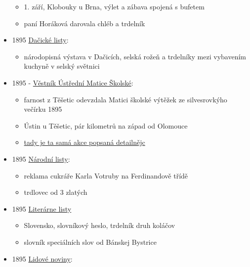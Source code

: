 \begin{itemize}
  \begin{itemize}
  \tightlist
  \item
    1. září, Klobouky u Brna, výlet a zábava spojená s bufetem
  \item
    paní Horáková darovala chléb a trdelník
  \end{itemize}
\item
  1895
  \href{https://www.digitalniknihovna.cz/vkol/uuid/uuid:a7f4aea1-a2cd-4d9f-a1fa-b43aa3c25dff}{Dačické
  listy}:

  \begin{itemize}
  \tightlist
  \item
    národopisná výstava v Dačicích, selská rožeň a trdelníky mezi
    vybavením kuchyně v selský světnici
  \end{itemize}
\item
  1895 -
  \href{https://ndk.cz/view/uuid:77d41380-a2e4-11e7-a093-005056825209?page=uuid\%3A9cb54070-a343-11e7-a093-005056825209&fulltext=trdeln\%C3\%ADk}{Věstník
  Ústřední Matice Školské}:

  \begin{itemize}
  \tightlist
  \item
    farnost z Těšetic odevzdala Matici školské výtěžek ze silvesrovkýho
    večírku 1895
  \item
    Ústin u Těšetic, pár kilometrů na západ od Olomouce
  \item
    \href{https://ndk.cz/view/uuid:eb8e3d99-435d-11dd-b505-00145e5790ea?page=uuid\%3A04295899-610e-49f5-b5b3-35f73d41b05d&fulltext=trdeln\%C3\%ADk}{tady
    je ta samá akce popsaná detailnějc}
  \end{itemize}
\item
  1895
  \href{https://ceskadigitalniknihovna.cz/uuid/uuid:6ef09ed4-435f-11dd-b505-00145e5790ea}{Národní
  listy}:

  \begin{itemize}
  \tightlist
  \item
    reklama cukráře Karla Votruby na Ferdinandově třídě
  \item
    trdlovec od 3 zlatých
  \end{itemize}
\item
  1895
  \href{https://dikda.snk.sk/uuid/uuid:dde694e6-6191-4983-bed1-e6328f0c9bf4}{Literárne
  listy}

  \begin{itemize}
  \tightlist
  \item
    Slovensko, slovníkový heslo, trdelník druh koláčov
  \item
    slovník speciálních slov od Bánskej Bystrice
  \end{itemize}
\item
  1895
  \href{https://ceskadigitalniknihovna.cz/uuid/uuid:22933190-6ef8-11ed-a5ba-005056827e51}{Lidové
  noviny}:


\end{itemize}
